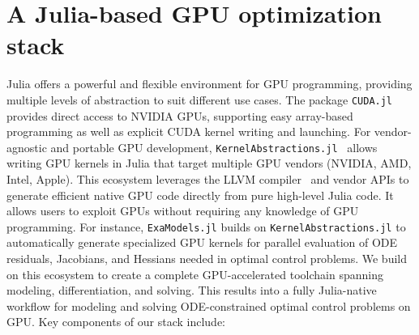 



\section{A Julia-based GPU optimization stack}
Julia offers a powerful and flexible environment for GPU programming, providing multiple levels of abstraction to suit different use cases.
The package \texttt{CUDA.jl}~\cite{besard2018juliagpu,besard2019prototyping} provides direct access to NVIDIA GPUs, supporting easy array-based programming as well as explicit CUDA kernel writing and launching.
%
For vendor-agnostic and portable GPU development, \texttt{KernelAbstractions.jl}~\cite{Churavy_KernelAbstractions_jl} allows writing GPU kernels in Julia that target multiple GPU vendors (NVIDIA, AMD, Intel, Apple).
%
This ecosystem leverages the LLVM compiler~\cite{lattner2004llvm} and vendor APIs to generate efficient native GPU code directly from pure high-level Julia code.
It allows users to exploit GPUs without requiring any knowledge of GPU programming.
For instance, \texttt{ExaModels.jl} builds on \texttt{KernelAbstractions.jl} to automatically generate specialized GPU kernels for parallel evaluation of ODE residuals, Jacobians, and Hessians needed in optimal control problems.
%
We build on this ecosystem to create a complete GPU-accelerated toolchain spanning modeling, differentiation, and solving.
This results into a fully Julia-native workflow for modeling and solving ODE-constrained optimal control problems on GPU.
%
Key components of our stack include:

